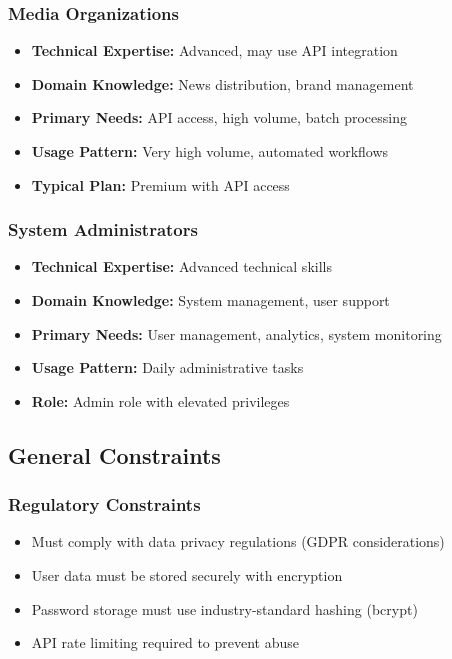 \documentclass[12pt,a4paper]{article}
\begin{document}
\subsubsection{Media Organizations}
\begin{itemize}
    \item \textbf{Technical Expertise:} Advanced, may use API integration
    \item \textbf{Domain Knowledge:} News distribution, brand management
    \item \textbf{Primary Needs:} API access, high volume, batch processing
    \item \textbf{Usage Pattern:} Very high volume, automated workflows
    \item \textbf{Typical Plan:} Premium with API access
\end{itemize}

\subsubsection{System Administrators}
\begin{itemize}
    \item \textbf{Technical Expertise:} Advanced technical skills
    \item \textbf{Domain Knowledge:} System management, user support
    \item \textbf{Primary Needs:} User management, analytics, system monitoring
    \item \textbf{Usage Pattern:} Daily administrative tasks
    \item \textbf{Role:} Admin role with elevated privileges
\end{itemize}

\subsection{General Constraints}

\subsubsection{Regulatory Constraints}
\begin{itemize}
    \item Must comply with data privacy regulations (GDPR considerations)
    \item User data must be stored securely with encryption
    \item Password storage must use industry-standard hashing (bcrypt)
    \item API rate limiting required to prevent abuse
\end{itemize}
\end{document}

